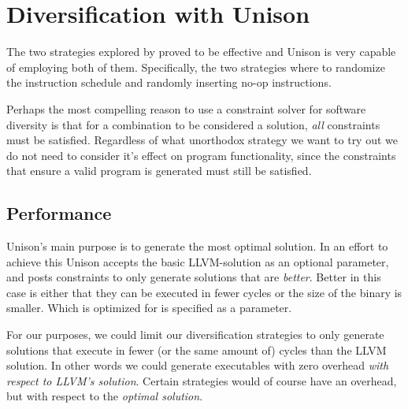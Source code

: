 \chapter{Diversification with Unison}

The two strategies explored by \textcite{large-scale-automated} proved to be
effective and Unison is very capable of employing both of them. Specifically, the two
strategies where to randomize the instruction schedule and randomly inserting no-op
instructions.

Perhaps the most compelling reason to use a constraint solver for software diversity is that
for a combination to be considered a solution, \textit{all} constraints must be satisfied.
Regardless of what unorthodox strategy we want to try out we do not need to consider it's
effect on program functionality, since the constraints that ensure a valid program is
generated must still be satisfied.




\section{Performance}

Unison's main purpose is to generate the most optimal solution. In an effort to achieve 
this Unison accepts the basic LLVM-solution as an optional parameter, and posts constraints
to only generate solutions that are \textit{better}. Better in this case is either that
they can be executed in fewer cycles or the size of the binary is smaller. Which is optimized
for is specified as a parameter.

For our purposes, we could limit our diversification strategies to only generate solutions
that execute in fewer (or the same amount of) cycles than the LLVM solution. In other words
we could generate executables with zero overhead \textit{with respect to LLVM's solution}.
Certain strategies would of course have an overhead, but with respect to the \textit{optimal
solution}.

